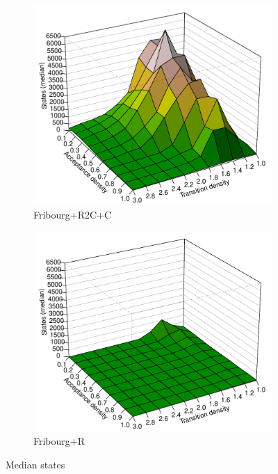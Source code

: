\begin{figure}[ht]
  \hfill
  \begin{subfigure}[t]{\perspwidth\textwidth}
  \centering
  \includegraphics[width=\textwidth]{figures/r/internal/goal/s.median.Fribourg+R2C+C.pdf}
  \caption{Fribourg+R2C+C}
  \end{subfigure}
  \hfill
  \begin{subfigure}[t]{\perspwidth\textwidth}
  \centering
  \includegraphics[width=\textwidth]{figures/r/internal/goal/s.median.Fribourg+R.pdf}
  \caption{Fribourg+R}
  \end{subfigure}
  \hfill  
\caption{Median states}
\end{figure}

